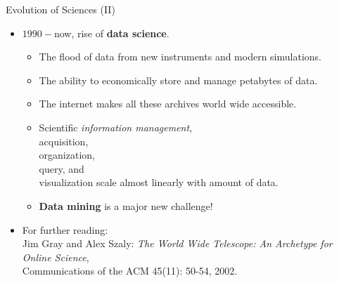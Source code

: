 \begin{frame}{Evolution of Sciences (II)}
	\begin{itemize}
		\item $1990-$now, rise of \textbf{data science}.
		      \begin{itemize}
			      \item The flood of data from new instruments and modern simulations.
			      \item The ability to economically store and manage petabytes of
			            data.
			      \item The internet makes all these archives world wide accessible.
			      \item Scientific \emph{information management}, \\
			            acquisition,\\
			            organization, \\
			            query, and \\
			            visualization scale almost linearly with amount of data.
			      \item \textbf{Data mining} is a major new challenge!
		      \end{itemize}
		\item For further reading:\\
		      \small{Jim Gray and Alex Szaly: \emph{The World Wide Telescope: An
				      Archetype for Online Science}, \\ Communications of the ACM
			      45(11):
			      50-54, 2002.}
	\end{itemize}
\end{frame}


